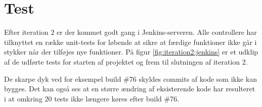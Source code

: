 \section{Test}

Efter iteration 2 er der kommet godt gang i Jenkins-serveren. Alle controllere har tilknyttet en række unit-tests for løbende at sikre at færdige funktioner ikke går i stykker når der tilføjes nye funktioner.
På figur \ref{fig:iteration2:jenkins} er et udklip af de udførte tests for starten af projektet og frem til slutningen af iteration 2.


De skarpe dyk ved for eksempel build \#76 skyldes commits af kode som ikke kan bygges.
Det kan også ses at en større ændring af eksisterende kode har resulteret i at omkring 20 tests ikke længere køres efter build \#76.